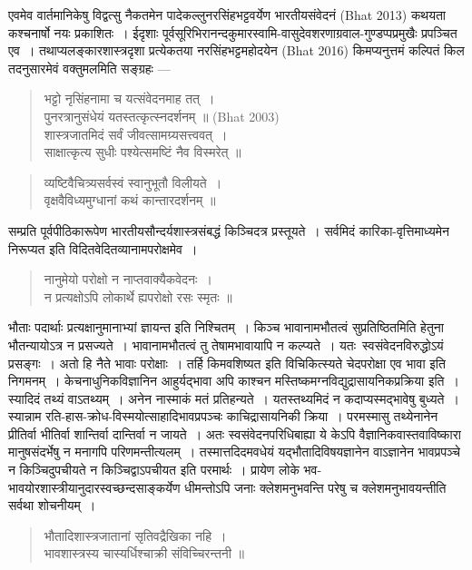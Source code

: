 {\dev एवमेव वार्तमानिकेषु विद्वत्सु नैकतमेन पादेकल्लुनरसिंहभट्टवर्येण भारतीयसंवेदनं (Bhat 2013) कथयता कश्चनार्षो नयः प्रकाशितः~। ईदृशाः पूर्वसूरिभिरानन्दकुमारस्वामि-वासुदेवशरणाग्रवाल-गुण्डप्पप्रमुखैः प्रपञ्चित एव~। तथाप्यलङ्कारशास्त्रदृशा प्रत्येकतया नरसिंहभट्टमहोदयेन (Bhat 2016) किमप्यनुत्तमं कल्पितं किल तदनुसारमेवं वक्तुमलमिति सङ्ग्रहः ---}
\begin{quote}
{\dev भट्टो नृसिंहनामा च यत्संवेदनमाह तत्~।}\\
{\dev पुनरत्रानुसंधेयं यतस्तत्कृत्स्नदर्शनम् ॥} (Bhat 2003)\\ 
{\dev शास्त्रजातमिदं सर्वं जीवत्सामग्र्यसत्त्ववत्~।}\\
{\dev साक्षात्कृत्य सुधीः पश्येत्समष्टिं नैव विस्मरेत् ॥}  
\end{quote}
\begin{quote}
{\dev व्यष्टिवैचित्र्यसर्वस्वं स्वानुभूतौ विलीयते~।}\\
{\dev वृक्षवैविध्यमुग्धानां कथं कान्तारदर्शनम् ॥}
\end{quote}

{\dev सम्प्रति पूर्वपीठिकारूपेण भारतीयसौन्दर्यशास्त्रसंबद्धं किञ्चिदत्र प्रस्तूयते~। सर्वमिदं कारिका-वृत्तिमाध्यमेन निरूप्यत इति विदितवेदितव्यानामपरोक्षमेव~।}
\begin{quote}
{\dev नानुमेयो परोक्षो न नाप्तवाक्यैकवेदनः~।}\\
{\dev न प्रत्यक्षोऽपि लोकार्थे ह्यपरोक्षो रसः स्मृतः ॥}
\end{quote}

{\dev भौताः पदार्थाः प्रत्यक्षानुमानाभ्यां ज्ञायन्त इति निश्चितम्~। किञ्च भावानामभौतत्वं सुप्रतिष्ठित\-मिति हेतुना भौतन्यायोऽत्र न प्रसज्यते~। भावानामभौतत्वं तु तेषामभावायापि न कल्प्यते~। यतः\ स्वसंवेदनविरुद्धोऽयं प्रसङ्गः~। अतो हि नैते भावाः परोक्षाः~। तर्हि किमवशिष्यत इति विचिकित्स्यते चेदपरोक्षा एव भावा इति  निगमनम्~। केचनाधुनिकविज्ञानिन आहुर्यद्भावा अपि काश्चन मस्तिष्कमग्नविद्युद्रासायनिकप्रक्रिया इति~। स्यादिदं तथ्यं वाऽतथ्यम्~। अनेन नास्माकं मतं प्रतिहन्यते~। यतस्तथ्यमिदं न कदाप्यस्मद्भावेषु बुध्यते~। स्यान्नाम रति-हास-क्रोध-विस्मयोत्साहादिभावप्रपञ्चः काचिद्रासायनिकी क्रिया~। परमस्मासु तथ्येनानेन प्रीतिर्वा भीतिर्वा शान्तिर्वा दान्तिर्वा न जायते~। अतः स्वसंवेदनपरिधिबाह्या ये केऽपि वैज्ञानिकवास्तवाविष्कारा मानुषसंदर्भेषु न मनागपि परिणमन्तीत्यलम्~। तस्मात्तदिदमवधेयं यद्भौतादिविषयज्ञानेन वाऽज्ञानेन भावप्रपञ्चे न किञ्चिदुपचीयते न किञ्चिद्वाऽपचीयत इति परमार्थः~। प्रायेण लोके भव-भावयोरशास्त्रीयानुदारस्वच्छन्दसाङ्कर्येण धीमन्तोऽपि जनाः क्लेशमनुभवन्ति परेषु च क्लेशमनुभावयन्तीति सर्वथा शोचनीयम्~।}
\begin{quote}
{\dev भौतादिशास्त्रजातानां सृतिवद्रैखिका नहि~।}\\
{\dev भावशास्त्रस्य चास्यर्धिश्चाक्री संविच्चिरन्तनी ॥}
\end{quote}

